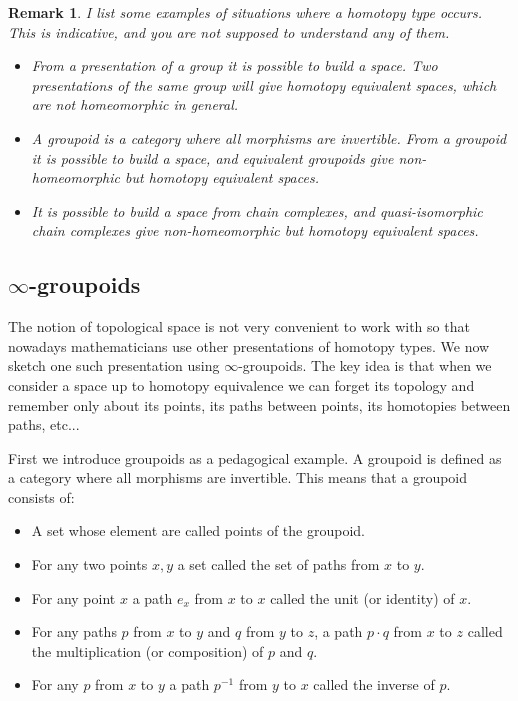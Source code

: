 \documentclass{article}
\newcommand{\sse}[1]{\medbreak \subsection{#1}}
\newtheorem{remark}{Remark}
\begin{document}
\begin{remark}
I list some examples of situations where a homotopy type occurs. This is indicative, and you are not supposed to understand any of them.
\begin{itemize}
\item From a presentation of a group it is possible to build a space. Two presentations of the same group will give homotopy equivalent spaces, which are not homeomorphic in general.
\item A groupoid is a category where all morphisms are invertible. From a groupoid it is possible to build a space, and equivalent groupoids give non-homeomorphic but homotopy equivalent spaces.
\item It is possible to build a space from chain complexes, and quasi-isomorphic chain complexes give non-homeomorphic but homotopy equivalent spaces.
\end{itemize}
\end{remark}


\sse{$\infty$-groupoids}

The notion of topological space is not very convenient to work with so that nowadays mathematicians use other presentations of homotopy types. We now sketch one such presentation using $\infty$-groupoids. The key idea is that when we consider a space up to homotopy equivalence we can forget its topology and remember only about its points, its paths between points, its homotopies between paths, etc...

First we introduce groupoids as a pedagogical example. A groupoid is defined as a category where all morphisms are invertible. This means that a groupoid consists of:
\begin{itemize}
\item A set whose element are called points of the groupoid.
\item For any two points $x,y$ a set called the set of paths from $x$ to $y$.
\item For any point $x$ a path $e_x$ from $x$ to $x$ called the unit (or identity) of $x$.
\item For any paths $p$ from $x$ to $y$ and $q$ from $y$ to $z$, a path $p\cdot q$ from $x$ to $z$ called the multiplication (or composition) of $p$ and $q$.
\item For any $p$ from $x$ to $y$ a path $p^{-1}$ from $y$ to $x$ called the inverse of $p$. 
\end{itemize}
\end{document}
